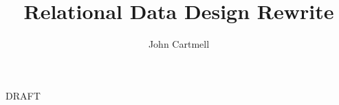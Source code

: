 \documentclass[10pt,a4paper]{article}
\begin{document}
\title{Relational Data Design Rewrite}
\author{John Cartmell}
\maketitle
\begin{center}
DRAFT
\end{center}


% 




%

% 
%
	 
\end{document}
